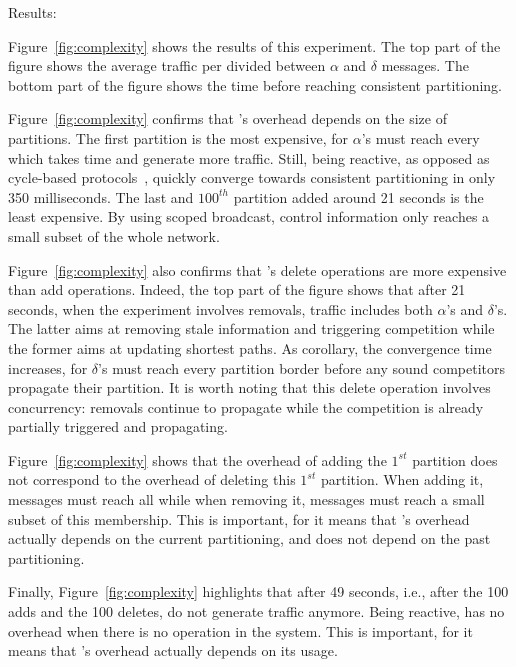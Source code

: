 \begin{asparadesc}
\item [Results:]

Figure~\ref{fig:complexity} shows the results of this experiment. The
top part of the figure shows the average traffic per \process divided
between $\alpha$ and $\delta$ messages. The bottom part of the figure
shows the time before reaching consistent partitioning.

\noindent Figure~\ref{fig:complexity} confirms that \NAME's overhead
depends on the size of partitions. The first partition is the most
expensive, for $\alpha$'s must reach every \process which takes time
and generate more traffic. Still, being reactive, as opposed as
cycle-based protocols~\cite{jelasity2007gossip}, \NAME quickly
converge towards consistent partitioning in only 350 milliseconds. The
last and $100^{th}$ partition added around 21 seconds is the least
expensive. By using scoped broadcast, control information only reaches
a small subset of the whole network.

\noindent Figure~\ref{fig:complexity} also confirms that \NAME's
delete operations are more expensive than add operations. Indeed, the
top part of the figure shows that after 21 seconds, when the
experiment involves removals, traffic includes both $\alpha$'s and
$\delta$'s. The latter aims at removing stale information and
triggering competition while the former aims at updating shortest
paths. As corollary, the convergence time increases, for $\delta$'s
must reach every partition border before any sound competitors
propagate their partition. It is worth noting that this delete
operation involves concurrency: removals continue to propagate while
the competition is already partially triggered and propagating.

\noindent Figure~\ref{fig:complexity} shows that the overhead of
adding the $1^{st}$ partition does not correspond to the overhead of
deleting this $1^{st}$ partition. When adding it, messages must reach
all \processes while when removing it, messages must reach a small
subset of this membership. This is important, for it means that
\NAME's overhead actually depends on the current partitioning, and
does not depend on the past partitioning.

\noindent Finally, Figure~\ref{fig:complexity} highlights that after
49 seconds, i.e., after the 100 adds and the 100 deletes, \processes
do not generate traffic anymore. Being reactive, \NAME has no overhead
when there is no operation in the system. This is important, for it
means that \NAME's overhead actually depends on its usage.

\end{asparadesc}

